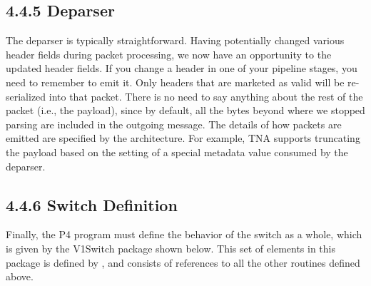 \documentclass[letterpaper,11pt,english]{sphinxmanual}
\begin{document}
\subsection{4.4.5 Deparser}
\label{\detokenize{switch:deparser}}
The deparser is typically straightforward. Having potentially
changed various header fields during packet processing, we now have an
opportunity to  the updated header fields. If you change a
header in one of your pipeline stages, you need to remember to emit
it. Only headers that are marketed as valid will be re-serialized into
that packet. There is no need to say anything about the rest of the
packet (i.e., the payload), since by default, all the bytes beyond
where we stopped parsing are included in the outgoing message. The
details of how packets are emitted are specified by the architecture.
For example, TNA supports truncating the payload based on the setting
of a special metadata value consumed by the deparser.

\begin{sphinxVerbatim}[commandchars=\\\{\}]

 
                 
                   

     
\end{sphinxVerbatim}


\subsection{4.4.6 Switch Definition}
\label{\detokenize{switch:switch-definition}}
Finally, the P4 program must define the behavior of the switch as a
whole, which is given by the V1Switch package shown below. This set of
elements in this package is defined by , and consists of
references to all the other routines defined above.
\end{document}
